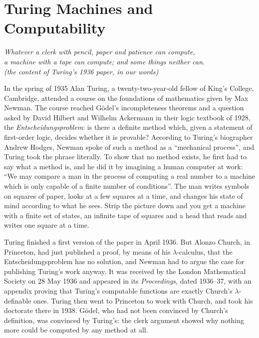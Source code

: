 \chapter{Turing Machines and Computability}\label{ch:turing}

\begin{center}\itshape
Whatever a clerk with pencil, paper and patience can compute,\\
a machine with a tape can compute; and some things neither can.\\
\upshape(the content of Turing's 1936 paper, in our words)
\end{center}

In the spring of 1935 Alan Turing, a twenty-two-year-old fellow of King's College, Cambridge, attended a course on the foundations of mathematics given by Max Newman. The course reached Gödel's incompleteness theorems and a question asked by David Hilbert and Wilhelm Ackermann in their logic textbook of 1928, the \emph{Entscheidungsproblem}: is there a definite method which, given a statement of first-order logic, decides whether it is provable? According to Turing's biographer Andrew Hodges, Newman spoke of such a method as a ``mechanical process'', and Turing took the phrase literally. To show that no method exists, he first had to say what a method is, and he did it by imagining a human computer at work: ``We may compare a man in the process of computing a real number to a machine which is only capable of a finite number of conditions''. The man writes symbols on squares of paper, looks at a few squares at a time, and changes his state of mind according to what he sees. Strip the picture down and you get a machine with a finite set of states, an infinite tape of squares and a head that reads and writes one square at a time.

Turing finished a first version of the paper in April 1936. But Alonzo Church, in Princeton, had just published a proof, by means of his $\lambda$-calculus, that the Entscheidungsproblem has no solution, and Newman had to argue the case for publishing Turing's work anyway. It was received by the London Mathematical Society on 28 May 1936 and appeared in its \emph{Proceedings}, dated 1936--37, with an appendix proving that Turing's computable functions are exactly Church's $\lambda$-definable ones. Turing then went to Princeton to work with Church, and took his doctorate there in 1938. Gödel, who had not been convinced by Church's definition, was convinced by Turing's: the clerk argument showed why nothing more could be computed by any method at all.

